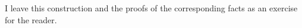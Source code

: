


%



%


I leave this construction and the proofs of the corresponding facts as an exercise for the reader. 

